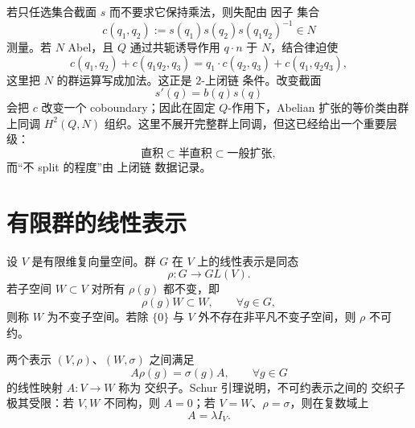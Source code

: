 若只任选集合截面 $s$ 而不要求它保持乘法，则失配由 因子 集合
\[
c(q_1,q_2)
:=s(q_1)s(q_2)s(q_1q_2)^{-1}
\in N
\]
测量。若 $N$ Abel，且 $Q$ 通过共轭诱导作用 $q\cdot n$ 于 $N$，结合律迫使
\begin{equation*}c(q_1,q_2)
+c(q_1q_2,q_3)
=q_1\cdot c(q_2,q_3)
+c(q_1,q_2q_3),\end{equation*}
这里把 $N$ 的群运算写成加法。这正是 $2$-上闭链 条件。改变截面
\[
s'(q)=b(q)s(q)
\]
会把 $c$ 改变一个 coboundary；因此在固定 $Q$-作用下，Abelian 扩张的等价类由群上同调 $H^2(Q,N)$ 组织。这里不展开完整群上同调，但这已经给出一个重要层级：
\[
\text{直积}
\subset
\text{半直积}
\subset
\text{一般扩张},
\]
而“不 split 的程度”由 上闭链 数据记录。

\section{有限群的线性表示}
\label{sec:finite-group-representations}
设 $V$ 是有限维复向量空间。群 $G$ 在 $V$ 上的线性表示是同态
\[
\rho:G\longrightarrow GL(V).
\]
若子空间 $W\subset V$ 对所有 $\rho(g)$ 都不变，即
\[
\rho(g)W\subset W,
\qquad \forall g\in G,
\]
则称 $W$ 为不变子空间。若除 $\{0\}$ 与 $V$ 外不存在非平凡不变子空间，则 $\rho$ 不可约。

两个表示 $(V,\rho)$、$(W,\sigma)$ 之间满足
\[
A\rho(g)=\sigma(g)A,
\qquad \forall g\in G
\]
的线性映射 $A:V\to W$ 称为 交织子。Schur 引理说明，不可约表示之间的 交织子 极其受限：若 $V,W$ 不同构，则 $A=0$；若 $V=W$、$\rho=\sigma$，则在复数域上
\begin{equation}
A=\lambda I_V.
\label{eq:schur-scalar}
\end{equation}

